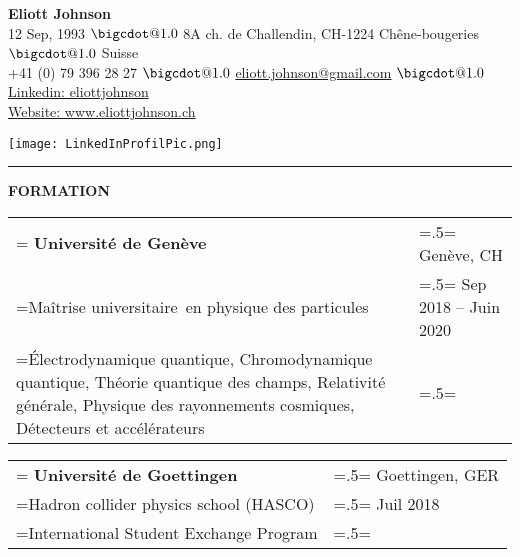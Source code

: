 \documentclass[letterpaper, 11pt]{article}
\makeatletter
\newcommand*\bigcdot{\mathpalette\bigcdot@{1.0}}
\newcommand*\bigcdot@[2]{\mathbin{\vcenter{\hbox{\scalebox{#2}{$\m@th#1\bullet$}}}}}
\makeatother
\begin{document}
\setlength\parindent{0pt}\textbf{}

\hfill%
\begin{minipage}{0.79\textwidth}\flushleft
\huge{\bf{Eliott Johnson}}\\
\normalsize
12 Sep, 1993 $\bigcdot$ 8A ch. de Challendin, CH-1224 Chêne-bougeries $\bigcdot$ Suisse \\
+41 (0) 79 396 28 27 $\bigcdot$  \href{mailto:eliott.johnson@gmail.com}{eliott.johnson@gmail.com} $\bigcdot$  \href{https://www.linkedin.com/in/eliottjohnson/}{Linkedin: eliottjohnson}\\
\href{https://www.eliottjohnson.ch}{Website: www.eliottjohnson.ch}
\end{minipage}
\begin{minipage}{0.19\textwidth}%
\texttt{[image: LinkedInProfilPic.png]}
\end{minipage}%
\vspace{0.25cm}

\noindent\rule{\textwidth}{1pt}

\begin{center}
\large\bf{FORMATION}
\end{center}

\begin{tabularx}{1.0\textwidth} { 
   >{\raggedright\arraybackslash\hsize=1.5\hsize\linewidth=\hsize}X 
   >{\raggedleft\arraybackslash\hsize=.5\hsize\linewidth=\hsize}X }
\normalsize
\bf{Université de Genève} & Genève, CH \\
\normalfont Maîtrise universitaire\ en physique des particules & Sep 2018 -- Juin 2020  \\  
Électrodynamique quantique, Chromodynamique quantique, Théorie quantique des champs, Relativité générale, Physique des rayonnements cosmiques, Détecteurs et accélérateurs &
\end{tabularx}
\vspace{0.25cm}

\begin{tabularx}{1.0\textwidth} { 
   >{\raggedright\arraybackslash\hsize=1.5\hsize\linewidth=\hsize}X 
   >{\raggedleft\arraybackslash\hsize=.5\hsize\linewidth=\hsize}X }
\normalsize
\bf{Université de Goettingen} & Goettingen, GER \\
\normalfont Hadron collider physics school (HASCO) & Juil 2018 \\
International Student Exchange Program
\end{tabularx}
\vspace{0.25cm}
\end{document}

